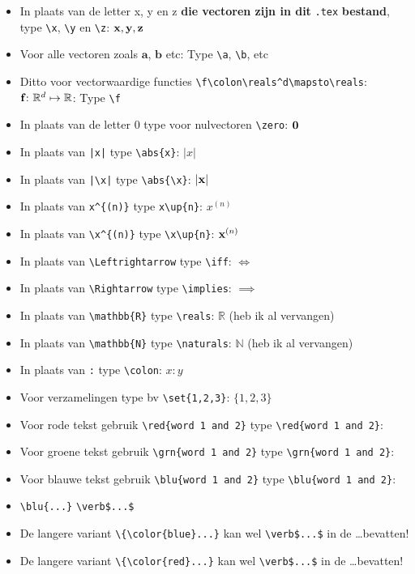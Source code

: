 \documentclass[a4paper]{exam}
\theoremstyle{definition}
\newcommand{\naturals}{\mathbb{N}}
\newcommand{\reals}{\mathbb{R}}
\def\set#1{\lbrace#1\rbrace}
\def\abs#1{{\left|#1\right|}}
\def\up#1{^{(#1)}}
\begin{document}
	\begin{itemize}
		\item In plaats van de letter x, y en z \textbf{die vectoren zijn in dit} \verb$.tex$ \textbf{bestand}, type
		\verb$\x$, \verb$\y$ en \verb$\z$: ${\textbf{x}}, {\textbf{y}}, {\textbf{z}}$
		\item Voor alle vectoren zoals $\mathbf{a}$, $\mathbf{b}$ etc: Type \verb$\a$, \verb$\b$, etc
		\item Ditto voor vectorwaardige functies \verb$\f\colon\reals^d\mapsto\reals$: $\f\colon\reals^d\mapsto\reals$: Type \verb$\f$
		\item In plaats van de letter 0 type voor nulvectoren \verb$\zero$: ${\textbf{0}}$
		\item In plaats van \verb$|x|$ type \verb$\abs{x}$: $\abs{x}$
		\item In plaats van \verb$|\x|$ type \verb$\abs{\x}$: $\abs{\x}$
		\item In plaats van \verb$x^{(n)}$ type \verb$x\up{n}$: $x\up{n}$
		\item In plaats van \verb$\x^{(n)}$ type \verb$\x\up{n}$: $\x\up{n}$
		\item In plaats van \verb$\Leftrightarrow$ type \verb$\iff$: $\iff$
		\item In plaats van \verb$\Rightarrow$ type \verb$\implies$: $\implies$
		\item In plaats van \verb$\mathbb{R}$ type \verb$\reals$: $\reals$ (heb ik al vervangen)
		\item In plaats van \verb$\mathbb{N}$ type \verb$\naturals$: $\naturals$ (heb ik al vervangen)
		\item In plaats van \verb$:$ type \verb$\colon$: $x\colon y$
		\item Voor verzamelingen type bv \verb$\set{1,2,3}$: $\set{1,2,3}$
		\item Voor rode tekst gebruik \verb$$ type \verb$\red{word 1 and 2}$: \red{word 1 and 2}
		\item Voor groene tekst gebruik \verb$$ type \verb$\grn{word 1 and 2}$: \grn{word 1 and 2}
		\item Voor blauwe tekst gebruik \verb$$ type \verb$\blu{word 1 and 2}$: \blu{word 1 and 2}
		\item {} \verb$\blu{...}$  \verb#\verb$...$# 
		\item De langere variant \verb$\{\color{blue}...}$ kan wel \verb#\verb$...$# in de \dots bevatten!
		\item De langere variant \verb$\{\color{red}...}$ kan wel \verb#\verb$...$# in de \dots bevatten!

\end{itemize}
\end{document}
